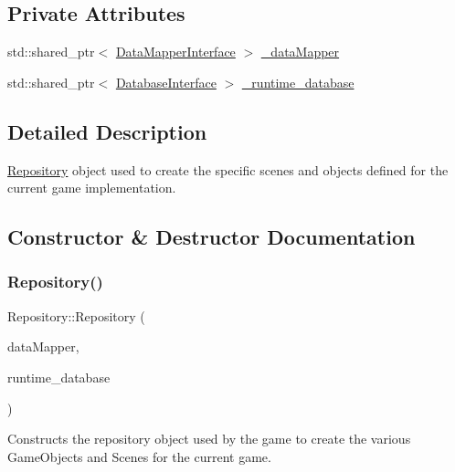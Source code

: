 \subsection*{Private Attributes}
\begin{DoxyCompactItemize}
\item 
std\+::shared\+\_\+ptr$<$ \hyperlink{class_data_mapper_interface}{Data\+Mapper\+Interface} $>$ \hyperlink{class_repository_a0bcbb13dbddc52d69c4b2d46a7730023}{\+\_\+data\+Mapper}
\item 
std\+::shared\+\_\+ptr$<$ \hyperlink{class_database_interface}{Database\+Interface} $>$ \hyperlink{class_repository_afe9b5f2e11e176745c227276c07bcdcb}{\+\_\+runtime\+\_\+database}
\end{DoxyCompactItemize}


\subsection{Detailed Description}
\hyperlink{class_repository}{Repository} object used to create the specific scenes and objects defined for the current game implementation. 

\subsection{Constructor \& Destructor Documentation}
\mbox{\label{class_repository_a0464c81256d66e31e9d5849d3ae0dfb2}} 
\subsubsection{\texorpdfstring{Repository()}{Repository()}}
{\footnotesize\ttfamily Repository\+::\+Repository (\begin{DoxyParamCaption}\item[{std\+::shared\+\_\+ptr$<$ \hyperlink{class_data_mapper_interface}{Data\+Mapper\+Interface} $>$}]{data\+Mapper,  }\item[{std\+::shared\+\_\+ptr$<$ \hyperlink{class_database_interface}{Database\+Interface} $>$}]{runtime\+\_\+database }\end{DoxyParamCaption})}



Constructs the repository object used by the game to create the various Game\+Objects and Scenes for the current game. 


